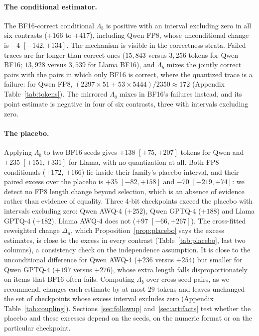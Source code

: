 \documentclass[11pt,a4paper]{article}
\begin{document}
\paragraph{The conditional estimator.} The BF16-correct conditional $\Lambda_b$ is positive with an interval excluding zero in all six contrasts ($+166$ to $+417$), including Qwen FP8, whose unconditional change is $-4$ $[-142,+134]$. The mechanism is visible in the correctness strata. Failed traces are far longer than correct ones ($15{,}843$ versus $3{,}256$ tokens for Qwen BF16; $13{,}928$ versus $3{,}539$ for Llama BF16), and $\Lambda_b$ mixes the jointly correct pairs with the pairs in which only BF16 is correct, where the quantized trace is a failure: for Qwen FP8, $(2297\times 51+53\times 5444)/2350\approx 172$ (Appendix Table~\ref{tab:tokens}). The mirrored $\Lambda_q$ mixes in BF16's failures instead, and its point estimate is negative in four of six contrasts, three with intervals excluding zero.

\paragraph{The placebo.} Applying $\Lambda_b$ to two BF16 seeds gives $+138$ $[+75,+207]$ tokens for Qwen and $+235$ $[+151,+331]$ for Llama, with no quantization at all. Both FP8 conditionals ($+172$, $+166$) lie inside their family's placebo interval, and their paired excess over the placebo is $+35$ $[-82,+158]$ and $-70$ $[-219,+74]$: we detect no FP8 length change beyond selection, which is an absence of evidence rather than evidence of equality. Three 4-bit checkpoints exceed the placebo with intervals excluding zero: Qwen AWQ-4 ($+252$), Qwen GPTQ-4 ($+188$) and Llama GPTQ-4 ($+182$). Llama AWQ-4 does not ($+97$ $[-66,+267]$). The cross-fitted reweighted change $\Delta_a$, which Proposition~\ref{prop:placebo} says the excess estimates, is close to the excess in every contrast (Table~\ref{tab:placebo}, last two columns), a consistency check on the independence assumption. It is close to the unconditional difference for Qwen AWQ-4 ($+236$ versus $+254$) but smaller for Qwen GPTQ-4 ($+197$ versus $+276$), whose extra length falls disproportionately on items that BF16 often fails. Computing $\Lambda_b$ over cross-seed pairs, as we recommend, changes each estimate by at most $29$ tokens and leaves unchanged the set of checkpoints whose excess interval excludes zero (Appendix Table~\ref{tab:coupling}). Sections~\ref{sec:followup} and~\ref{sec:artifacts} test whether the placebo and these excesses depend on the seeds, on the numeric format or on the particular checkpoint.
\end{document}

